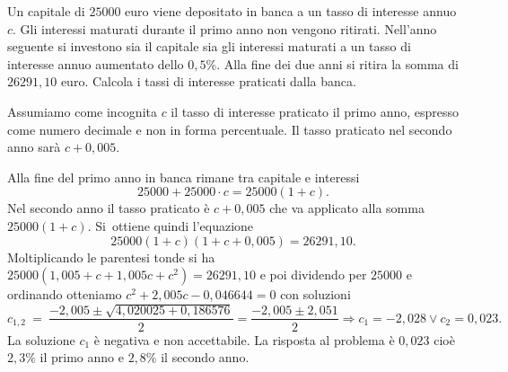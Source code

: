 \begin{problema}
Un capitale di $25000$ euro viene depositato in banca a un tasso di interesse 
annuo $c$. Gli interessi maturati durante il primo anno non vengono ritirati.
Nell'anno seguente si investono sia il capitale sia gli interessi maturati a un 
tasso di interesse annuo aumentato dello $0,5\%$. Alla fine dei due anni si 
ritira
la somma di $26291,10$ euro. Calcola i tassi di interesse praticati dalla banca.
\end{problema}
Assumiamo come incognita $c$ il tasso di interesse praticato il primo anno, 
espresso come numero decimale e
non in forma percentuale. Il tasso praticato nel secondo anno sarà $c+0,005$.

\begin{soluzione}
Alla fine del primo anno in banca rimane tra capitale e interessi \[25000 + 
25000 \cdot c = 25000 ( 1 + c ).\] Nel secondo anno il tasso praticato è 
$c+0,005$ che va applicato alla somma $25000(1+c)$. Si~ottiene quindi 
l'equazione \[25000 ( 1 + c ) ( 1 + c + 0,005 ) = 26291,10.\]
Moltiplicando le parentesi tonde si ha $25000 ( 1,005 + c + 1,005 c + c^{2} ) = 
26291,10$ e poi dividendo per $25000$ e ordinando otteniamo
$c^{2} + 2,005 c - 0,046644=0$ con soluzioni
\[c_{1,2}~=~\dfrac{- 2,005 \pm \sqrt{4,020025 + 0,186576}}{2} = \dfrac{-2,005 
\pm 2,051}{2}\Rightarrow c_{1} = - 2,028 \vee c_{2} = 0,023.\]
La soluzione $c_1$ è negativa e non accettabile. La risposta al problema è 
$0,023$ cioè $2,3\%$ il primo anno e $2,8\%$ il secondo anno.
\end{soluzione}
% 
% 
